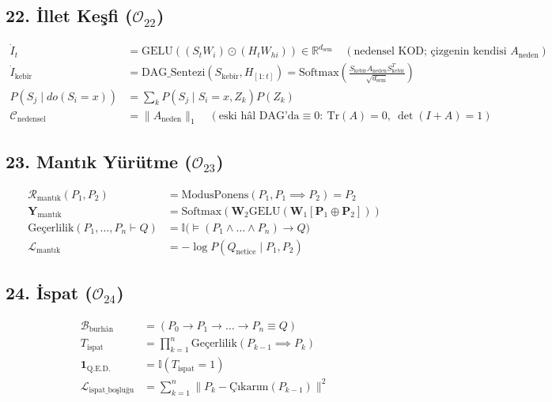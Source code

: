 \documentclass[11pt, a4paper]{article}
\begin{document}
\subsection{22. İllet Keşfi ($\mathcal{O}_{22}$)}
\begin{align}
\dot{I}_t &= \text{GELU}\left( (S_t W_i) \odot (H_t W_{hi}) \right) \in \mathbb{R}^{d_{\text{sem}}} \quad (\text{nedensel KOD; çizgenin kendisi } A_{\text{neden}}) \\
\dot{I}_{\text{kebîr}} &= \text{DAG\_Sentezi}(S_{\text{kebîr}}, H_{[1:t]}) = \text{Softmax}\left( \frac{S_{\text{kebîr}} A_{\text{neden}} S_{\text{kebîr}}^T}{\sqrt{d_{\text{sem}}}} \right) \\
P(S_j \mid do(S_i = x)) &= \sum_k P(S_j \mid S_i=x, Z_k) P(Z_k) \\
\mathcal{C}_{\text{nedensel}} &= \|A_{\text{neden}}\|_1 \quad (\text{eski hâl DAG'da} \equiv 0: \ \text{Tr}(A) = 0, \ \det(I+A) = 1)
\end{align}

\subsection{23. Mantık Yürütme ($\mathcal{O}_{23}$)}
\begin{align}
\mathcal{R}_{\text{mantık}}(P_1, P_2) &= \text{ModusPonens}(P_1, P_1 \implies P_2) = P_2 \\
\mathbf{Y}_{\text{mantık}} &= \text{Softmax}\left( \mathbf{W}_2 \text{GELU}(\mathbf{W}_1 [\mathbf{P}_1 \oplus \mathbf{P}_2]) \right) \\
\text{Geçerlilik}(P_1, \dots, P_n \vdash Q) &= \mathbb{I}\big( \models (P_1 \land \dots \land P_n) \to Q \big) \\
\mathcal{L}_{\text{mantık}} &= -\log P(Q_{\text{netice}} \mid P_1, P_2)
\end{align}

\subsection{24. İspat ($\mathcal{O}_{24}$)}
\begin{align}
\mathcal{B}_{\text{burhân}} &= (P_0 \to P_1 \to \dots \to P_n \equiv Q) \\
T_{\text{ispat}} &= \prod_{k=1}^n \text{Geçerlilik}(P_{k-1} \implies P_k) \\
\mathbf{1}_{\text{Q.E.D.}} &= \mathbb{I}(T_{\text{ispat}} = 1) \\
\mathcal{L}_{\text{ispat\_boşluğu}} &= \sum_{k=1}^n \| P_k - \text{Çıkarım}(P_{k-1}) \|^2
\end{align}
\end{document}
